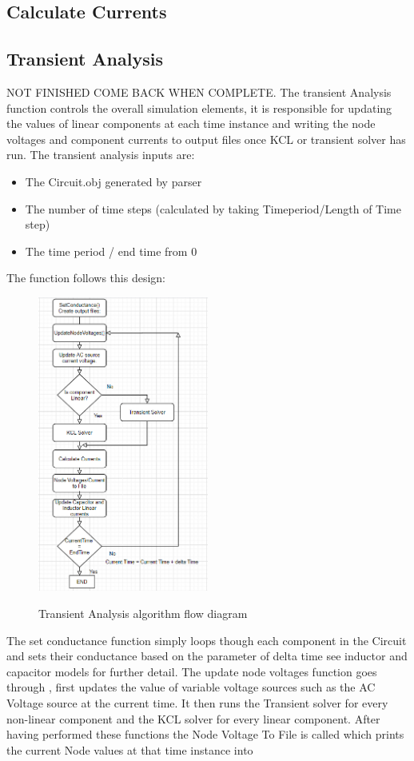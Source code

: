 \documentclass{article}
\begin{document}
\subsection{Calculate Currents}
\subsection{Transient Analysis}
NOT FINISHED COME BACK WHEN COMPLETE.
The transient Analysis function controls the overall simulation elements, it is responsible for updating the values of linear components at each time instance and writing the node voltages and component currents to output files once KCL or transient solver has run. The transient analysis inputs are: 
\begin{itemize}
    \item The Circuit.obj generated by parser
    \item The number of time steps (calculated by taking Timeperiod/Length of Time step) 
    \item The time period / end time from 0 
\end{itemize}
The function follows this design:

\begin{figure}[H]
\centering
\includegraphics[width =0.5\textwidth]{ images/TranAna.PNG}
\label{fig:TranAna} 
\caption{Transient Analysis algorithm flow diagram}
\end{figure}
The set conductance function simply loops though each component in the Circuit and sets their conductance based on the parameter of delta time see inductor and capacitor models for further detail.
\break
The update node voltages function goes through , first updates the value of variable voltage sources such as the AC Voltage source at the current time. It then runs the Transient solver for every non-linear component and the KCL solver for every linear component. After having performed these functions the Node Voltage To File is called which prints the current Node values at that time instance into
\end{document}
